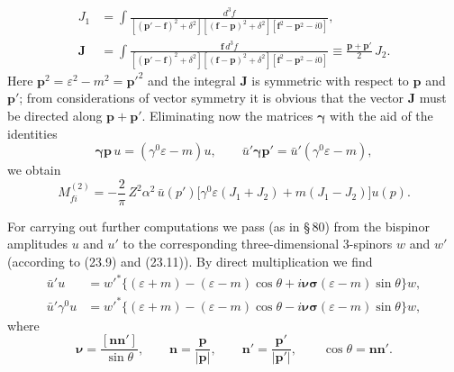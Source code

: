 \begin{equation}
\begin{split}
J_1 &= \int \frac{d^3\!f}{[(\mathbf{p}' - \mathbf{f})^2 + \delta^2][(\mathbf{f} - \mathbf{p})^2 + \delta^2][\mathbf{f}^2 - \mathbf{p}^2 - i0]},\\
\mathbf{J} &= \int \frac{\mathbf{f}\,d^3\!f}{[(\mathbf{p}' - \mathbf{f})^2 + \delta^2][(\mathbf{f} - \mathbf{p})^2 + \delta^2][\mathbf{f}^2 - \mathbf{p}^2 - i0]} \equiv \frac{\mathbf{p} + \mathbf{p}'}{2}\,J_2.
\end{split}
\label{eq:121.10}
\end{equation}
Here $\mathbf{p}^2 = \varepsilon^2 - m^2 = \mathbf{p}'^2$ and the integral $\mathbf{J}$ is symmetric with respect to $\mathbf{p}$ and $\mathbf{p}'$; from considerations of vector symmetry it is obvious that the vector $\mathbf{J}$ must be directed along $\mathbf{p} + \mathbf{p}'$. Eliminating now the matrices $\boldsymbol{\gamma}$ with the aid of the identities
\[
\boldsymbol{\gamma}\mathbf{p}\,u = (\gamma^0 \varepsilon - m)u, \qquad \bar{u}'\boldsymbol{\gamma}\mathbf{p}' = \bar{u}'(\gamma^0\varepsilon - m),
\]
we obtain
\begin{equation}
M_{fi}^{(2)} = -\frac{2}{\pi}\,Z^2\alpha^2\,\bar{u}(p')\bigl[\gamma^0\varepsilon(J_1 + J_2) + m(J_1 - J_2)\bigr]u(p).
\label{eq:121.11}
\end{equation}

For carrying out further computations we pass (as in \S\,80) from the bispinor amplitudes $u$ and $u'$ to the corresponding three-dimensional 3-spinors $w$ and $w'$ (according to (23.9) and (23.11)). By direct multiplication we find
\[
\begin{split}
\bar{u}'u &= w'^{*}\bigl\{(\varepsilon + m) - (\varepsilon - m)\cos\theta + i\boldsymbol{\nu\sigma}(\varepsilon - m)\sin\theta\bigr\}w,\\
\bar{u}'\gamma^0 u &= w'^{*}\bigl\{(\varepsilon + m) - (\varepsilon - m)\cos\theta - i\boldsymbol{\nu\sigma}(\varepsilon - m)\sin\theta\bigr\}w,
\end{split}
\]
where
\[
\boldsymbol{\nu} = \frac{[\mathbf{n}\mathbf{n}']}{\sin\theta}, \qquad \mathbf{n} = \frac{\mathbf{p}}{|\mathbf{p}|}, \qquad \mathbf{n}' = \frac{\mathbf{p}'}{|\mathbf{p}'|}, \qquad \cos\theta = \mathbf{n}\mathbf{n}'.
\]

